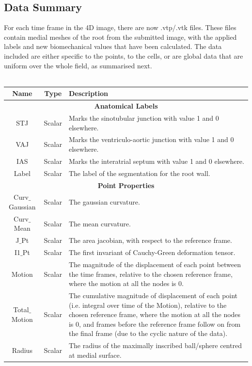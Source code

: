 \documentclass{article}
\begin{document}
\subsection*{Data Summary}
For each time frame in the 4D image, there are now .vtp/.vtk files. These files contain medial meshes of the root from the submitted image, with the applied labels and new biomechanical values that have been calculated. The data included are either specific to the points, to the cells, or are global data that are uniform over the whole field, as summarised next.
\\
~
\\
\begin{tabular}{|c|c|p{9.4cm}|}
	\hline
\textbf{Name}	& \textbf{Type} & \textbf{Description}   \\
	\hline
	\hline
	\multicolumn{3}{|c|}{\textbf{Anatomical Labels}} \\
	\hline
STJ	& Scalar  & Marks the sinotubular junction with value 1 and 0 elsewhere.  \\
	\hline
VAJ	& Scalar &  Marks the ventriculo-aortic junction with value 1 and 0 elsewhere.  \\
	\hline 
IAS	&Scalar &Marks the interatrial septum with value 1 and 0 elsewhere. \\
	\hline
Label	& Scalar & The label of the segmentation for the root wall.\\
\hline
\hline
\multicolumn{3}{|c|}{\textbf{Point Properties}} \\
	\hline
Curv$\_$Gaussian	& Scalar& The gaussian curvature.\\
\hline
Curv$\_$Mean	& Scalar& The mean curvature.\\
	\hline
J$\_$Pt	& Scalar& The area jacobian, with respect to the reference frame.\\
	\hline
I1$\_$Pt& Scalar & The first invariant of Cauchy-Green deformation tensor. \\
	\hline
Motion	& Scalar& The magnitude of the displacement of each point between the time frames, relative to the chosen reference frame, where the motion at all the nodes is 0.\\
	\hline
Total$\_$Motion	& Scalar& The cumulative magnitude of displacement of each point (i.e. integral over time of the Motion), relative to the chosen reference frame, where the motion at all the nodes is 0, and frames before the reference frame follow on from the final frame (due to the cyclic nature of the data).\\
	\hline
Radius	&Scalar & The radius of the maximally inscribed ball/sphere centred at medial surface.\\

\end{tabular}
\end{document}
